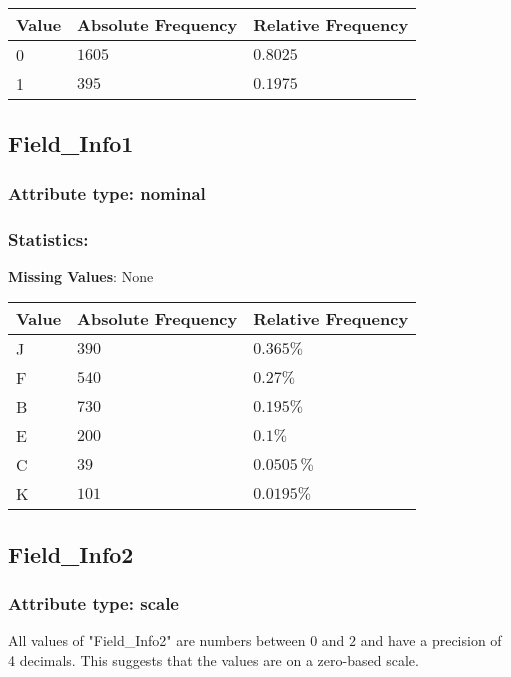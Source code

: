 \begin{table}[H]
	\renewcommand{\arraystretch}{1.25}
		\begin{tabular}{l|l|l}
			\textbf{Value} & \textbf{Absolute Frequency} & \textbf{Relative Frequency}\\\hline
			0 & $1605$ & $0.8025$\\ \hline
			1 & $395$ & $0.1975$\\
		\end{tabular}
\end{table}


\subsection{Field\_Info1}
\subsubsection{Attribute type: nominal}
\subsubsection{Statistics: }
\textbf{Missing Values}: None

\begin{table}[H]
	\renewcommand{\arraystretch}{1.25}
	\begin{tabular}{l|l|l}
		\textbf{Value} & \textbf{Absolute Frequency} & \textbf{Relative Frequency}\\\hline
J&$390$ & $0.365\%$\\\hline
F&$540$ & $0.27\%$\\\hline
B&$730$ & $0.195\%$\\\hline
E&$200$ & $0.1\%$\\\hline
C&$39$ & $0.0505\,\%$\\\hline
K&$101$ & $0.0195\%$\\
	\end{tabular}
\end{table}


\subsection{Field\_Info2}
\subsubsection{Attribute type: scale}
All values of "Field\_Info2" are numbers between $0$ and $2$ and have a precision of 4 decimals. This suggests that the values are on a zero-based scale.
